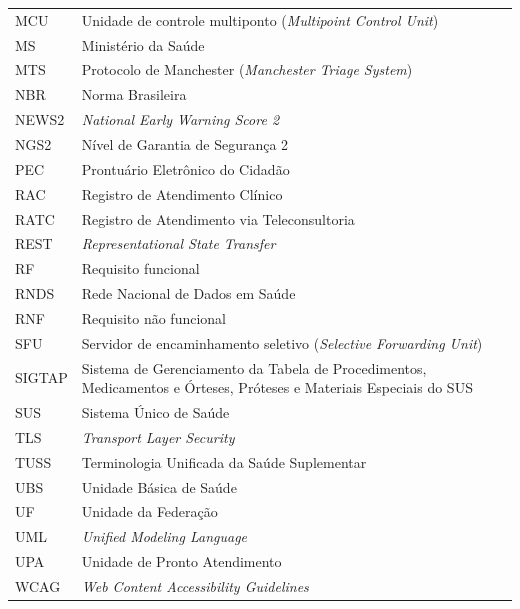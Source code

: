 \begin{longtable}{L{2.6cm} L{12.4cm}}
MCU & Unidade de controle multiponto (\textit{Multipoint Control Unit}) \\
MS & Ministério da Saúde \\
MTS & Protocolo de Manchester (\textit{Manchester Triage System}) \\
NBR & Norma Brasileira \\
NEWS2 & \textit{National Early Warning Score 2} \\
NGS2 & Nível de Garantia de Segurança 2 \\
PEC & Prontuário Eletrônico do Cidadão \\
RAC & Registro de Atendimento Clínico \\
RATC & Registro de Atendimento via Teleconsultoria \\
REST & \textit{Representational State Transfer} \\
RF & Requisito funcional \\
RNDS & Rede Nacional de Dados em Saúde \\
RNF & Requisito não funcional \\
SFU & Servidor de encaminhamento seletivo (\textit{Selective Forwarding Unit}) \\
SIGTAP & Sistema de Gerenciamento da Tabela de Procedimentos, Medicamentos e Órteses, Próteses e Materiais Especiais do SUS \\
SUS & Sistema Único de Saúde \\
TLS & \textit{Transport Layer Security} \\
TUSS & Terminologia Unificada da Saúde Suplementar \\
UBS & Unidade Básica de Saúde \\
UF & Unidade da Federação \\
UML & \textit{Unified Modeling Language} \\
UPA & Unidade de Pronto Atendimento \\
WCAG & \textit{Web Content Accessibility Guidelines} \\
\end{longtable}
\addtocounter{table}{-1}
